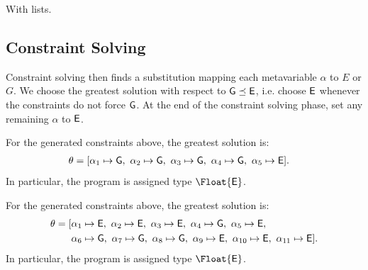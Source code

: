 \begin{example}
    With lists.
\end{example}

\subsection{Constraint Solving}
Constraint solving then finds a substitution mapping each metavariable $\alpha$ to $E$ or $G$. We choose the greatest solution with respect to $\mathsf{G} \preceq \mathsf{E}$, i.e. choose $\mathsf{E}$ whenever the constraints do not force $\mathsf{G}$. At the end of the constraint solving phase, set any remaining $\alpha$ to $\mathsf{E}$.

\begin{example}
  For the generated constraints above, the greatest solution is:
  \begin{align*}
    \theta = [&\alpha_1 \mapsto \mathsf{G},\ \alpha_2 \mapsto \mathsf{G},\ \alpha_3 \mapsto \mathsf{G},\ \alpha_4 \mapsto \mathsf{G},\ \alpha_5 \mapsto \mathsf{E} ].
  \end{align*}
  In particular, the program is assigned type $\Float{\E}$.
\end{example}

\begin{example}
  For the generated constraints above, the greatest solution is:
  \begin{align*}
    \theta = [&\alpha_1 \mapsto \mathsf{E},\ \alpha_2 \mapsto \mathsf{E},\ \alpha_3 \mapsto \mathsf{E},\ \alpha_4 \mapsto \mathsf{G},\ \alpha_5 \mapsto \mathsf{E}, \\
              &\alpha_6 \mapsto \mathsf{G},\ \alpha_7 \mapsto \mathsf{G},\ \alpha_8 \mapsto \mathsf{G},\ \alpha_9 \mapsto \mathsf{E},\ \alpha_{10} \mapsto \mathsf{E},\ \alpha_{11} \mapsto \mathsf{E} ].
  \end{align*}
  In particular, the program is assigned type $\Float{\E}$.
\end{example}
